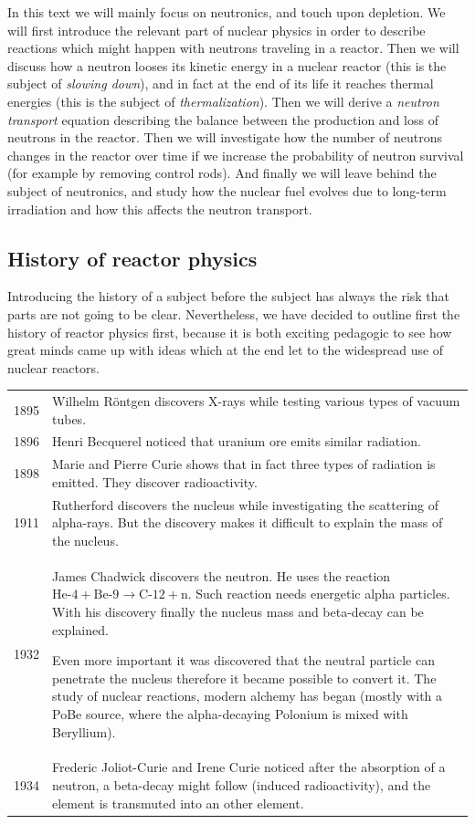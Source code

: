 In this text we will mainly focus on neutronics, and touch upon depletion. We will first introduce the relevant part of nuclear physics in order to describe reactions which might happen with neutrons traveling in a reactor. Then we will discuss how a neutron looses its kinetic energy in a nuclear reactor (this is the subject of \textit{slowing down}), and in fact at the end of its life it reaches thermal energies (this is the subject of \textit{thermalization}). Then we will derive a \textit{neutron transport} equation describing the balance between the production and loss of neutrons in the reactor. Then we will investigate how the number of neutrons changes in the reactor over time if we increase the probability of neutron survival (for example by removing control rods). And finally we will leave behind the subject of neutronics, and study how the nuclear fuel evolves due to long-term irradiation and how this affects the neutron transport.

\subsection{History of reactor physics}

Introducing the history of a subject before the subject has always the risk that parts are not going to be clear. Nevertheless, we have decided to outline first the history of reactor physics first, because it is both exciting pedagogic to see how great minds came up with ideas which at the end let to the widespread use of nuclear reactors.

\begin{tabularx}{\textwidth}{c | X}
1895 & Wilhelm R\"ontgen discovers X-rays  while testing various types of vacuum tubes. \\
1896 & Henri  Becquerel noticed that uranium ore emits similar radiation. \\
1898 & Marie and Pierre Curie shows that in fact three types of radiation is emitted. They discover radioactivity. \\
1911 & Rutherford discovers the nucleus while investigating the scattering of alpha-rays. But the discovery makes it difficult to explain the mass of the nucleus. \\
1932 & James Chadwick discovers the neutron. He uses the reaction $\text{He-4} + \text{Be-9} \rightarrow \text{C-12} + \text{n}$. Such reaction needs energetic alpha particles. With his discovery finally the nucleus mass and beta-decay can be explained.
 
Even more important it was discovered that the neutral particle can penetrate the nucleus therefore it became possible to convert it.  The study of nuclear reactions, modern alchemy has began (mostly with a PoBe source, where the alpha-decaying Polonium is mixed with Beryllium). \\
1934 & Frederic Joliot-Curie and Irene Curie noticed after the absorption of a neutron, a beta-decay might follow (induced radioactivity), and the element is transmuted into an other element. 
\end{tabularx}

